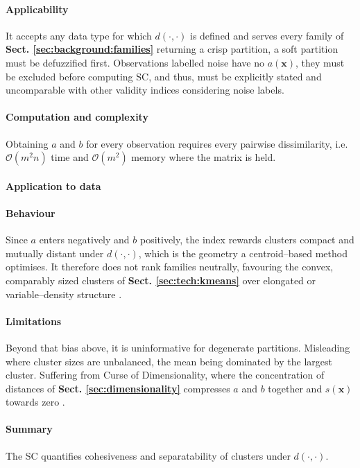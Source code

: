 \paragraph{Applicability}
\label{sec:measure:silhouette:applicability}
It accepts any data type for which $d(\cdot, \cdot)$ is defined and serves every family of \textbf{Sect. \ref{sec:background:families}} returning a crisp partition, a soft partition must be defuzzified first.
Observations labelled noise have no $a(\mathbf x)$, they must be excluded before computing SC, and thus, must be explicitly stated and uncomparable with other validity indices considering noise labels.

\paragraph{Computation and complexity}
\label{sec:measure:silhouette:complexity}
Obtaining $a$ and $b$ for every observation requires every pairwise dissimilarity, i.e. $\mathcal O(m^2 n)$ time and $\mathcal O(m^2)$ memory where the matrix is held.

\paragraph{Application to \projectname{} data}
\label{sec:measure:silhouette:application}

\paragraph{Behaviour}
\label{sec:measure:silhouette:behaviour}
Since $a$ enters negatively and $b$ positively, the index rewards clusters compact and mutually distant under $d(\cdot, \cdot)$, which is the geometry a centroid–based method optimises. It therefore does not rank families neutrally, favouring the convex, comparably sized clusters of \textbf{Sect. \ref{sec:tech:kmeans}} over elongated or variable–density structure \cite{ref_10, ref_11}.

\paragraph{Limitations}
\label{sec:measure:silhouette:limitations}
Beyond that bias above, it is uninformative for degenerate partitions. Misleading where cluster sizes are unbalanced, the mean being dominated by the largest cluster. Suffering from Curse of Dimensionality, where the concentration of distances of \textbf{Sect. \ref{sec:dimensionality}} compresses $a$ and $b$ together and $s(\mathbf x)$ towards zero \cite{ref_9}.

\paragraph{Summary}
\label{sec:measure:silhouette:summary}
The SC quantifies cohesiveness and separatability of clusters under $d(\cdot, \cdot)$.
